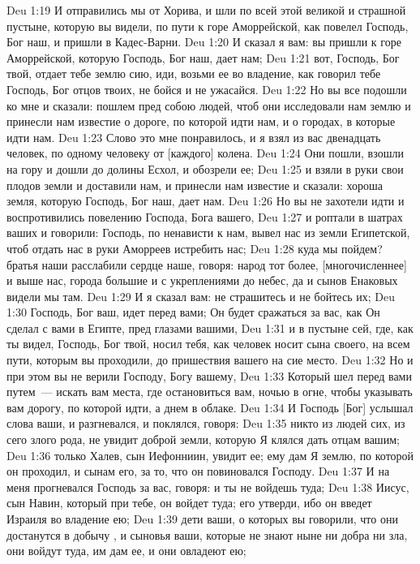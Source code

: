 \vs Deu 1:19 И отправились мы от Хорива, и шли по всей этой великой и страшной пустыне, которую вы видели, по пути к горе Аморрейской, как повелел Господь, Бог наш, и пришли в Кадес-Варни.
\vs Deu 1:20 И сказал я вам: вы пришли к горе Аморрейской, которую Господь, Бог наш, дает нам;
\vs Deu 1:21 вот, Господь, Бог твой, отдает тебе землю сию, иди, возьми ее во владение, как говорил тебе Господь, Бог отцов твоих, не бойся и не ужасайся.
\vs Deu 1:22 Но вы все подошли ко мне и сказали: пошлем пред собою людей, чтоб они исследовали нам землю и принесли нам известие о дороге, по которой идти нам, и о городах, в которые идти нам.
\vs Deu 1:23 Слово это мне понравилось, и я взял из вас двенадцать человек, по одному человеку от [каждого] колена.
\vs Deu 1:24 Они пошли, взошли на гору и дошли до долины Есхол, и обозрели ее;
\vs Deu 1:25 и взяли в руки свои плодов земли и доставили нам, и принесли нам известие и сказали: хороша земля, которую Господь, Бог наш, дает нам.
\vs Deu 1:26 Но вы не захотели идти и воспротивились повелению Господа, Бога вашего,
\vs Deu 1:27 и роптали в шатрах ваших и говорили: Господь, по ненависти к нам, вывел нас из земли Египетской, чтоб отдать нас в руки Аморреев  истребить нас;
\vs Deu 1:28 куда мы пойдем? братья наши расслабили сердце наше, говоря: народ тот более, [многочисленнее] и выше нас, города  большие и с укреплениями до небес, да и сынов Енаковых видели мы там.
\vs Deu 1:29 И я сказал вам: не страшитесь и не бойтесь их;
\vs Deu 1:30 Господь, Бог ваш, идет перед вами; Он будет сражаться за вас, как Он сделал с вами в Египте, пред глазами вашими,
\vs Deu 1:31 и в пустыне сей, где, как ты видел, Господь, Бог твой, носил тебя, как человек носит сына своего, на всем пути, которым вы проходили, до пришествия вашего на сие место.
\vs Deu 1:32 Но и при этом вы не верили Господу, Богу вашему,
\vs Deu 1:33 Который шел перед вами путем~--- искать вам места, где остановиться вам, ночью в огне, чтобы указывать вам дорогу, по которой идти, а днем в облаке.
\vs Deu 1:34 И Господь [Бог] услышал слова ваши, и разгневался, и поклялся, говоря:
\vs Deu 1:35 никто из людей сих, из сего злого рода, не увидит доброй земли, которую Я клялся дать отцам вашим;
\vs Deu 1:36 только Халев, сын Иефонниин, увидит ее; ему дам Я землю, по которой он проходил, и сынам его, за то, что он повиновался Господу.
\vs Deu 1:37 И на меня прогневался Господь за вас, говоря: и ты не войдешь туда;
\vs Deu 1:38 Иисус, сын Навин, который при тебе, он войдет туда; его утверди, ибо он введет Израиля во владение ею;
\vs Deu 1:39 дети ваши, о которых вы говорили, что они достанутся в добычу , и сыновья ваши, которые не знают ныне ни добра ни зла, они войдут туда, им дам ее, и они овладеют ею;
